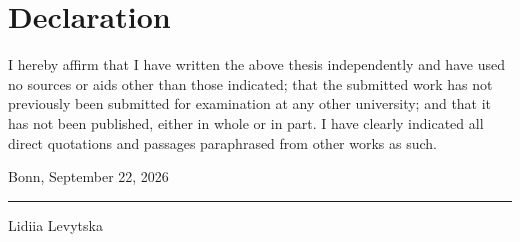 \renewcommand{\thepage}{}

\section*{Declaration}


I hereby affirm that I have written the above thesis independently and have
used no sources or aids other than those indicated; that the submitted work
has not previously been submitted for examination at any other university;
and that it has not been published, either in whole or in part. I have clearly
indicated all direct quotations and passages paraphrased from other works as
such.

\vspace{2.5\baselineskip}

\noindent
Bonn, September 22, 2026

\vspace{4.5\baselineskip}

\noindent
\rule{6cm}{0.4pt}

\noindent
Lidiia Levytska